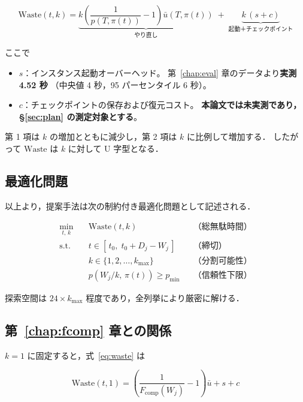 \documentclass[11pt,a4paper]{ltjsreport}
\newcommand{\Fcomp}{F_{\mathrm{comp}}}
\newcommand{\Waste}{\mathrm{Waste}}
\begin{document}
\begin{equation}
\boxed{\;
\Waste(t,k)
=
\underbrace{k \left( \frac{1}{p(T,\pi(t))} - 1 \right) \bar u(T,\pi(t))}_{\text{やり直し}}
\;+\;
\underbrace{k\,(s + c)}_{\text{起動＋チェックポイント}}
\;}
\label{eq:waste}
\end{equation}

ここで

\begin{itemize}
  \item $s$：インスタンス起動オーバーヘッド。
        第~\ref{chap:eval} 章のデータより\textbf{実測 4.52 秒}
        （中央値 4 秒，95 パーセンタイル 6 秒）。
  \item $c$：チェックポイントの保存および復元コスト。
        \textbf{本論文では未実測であり，\S\ref{sec:plan} の測定対象とする}。
\end{itemize}

第 1 項は $k$ の増加とともに減少し，第 2 項は $k$ に比例して増加する．
したがって $\Waste$ は $k$ に対して U 字型となる．

\subsection{最適化問題}

以上より，提案手法は次の制約付き最適化問題として記述される．

\begin{equation}
\begin{aligned}
\min_{t,\,k}\quad
  & \Waste(t,k) && \text{（総無駄時間）} \\[3pt]
\text{s.t.}\quad
  & t \in [\,t_0,\; t_0 + D_j - W_j\,] && \text{（締切）} \\[2pt]
  & k \in \{1, 2, \ldots, k_{\max}\}   && \text{（分割可能性）} \\[2pt]
  & p(W_j/k,\, \pi(t)) \geq p_{\min}   && \text{（信頼性下限）}
\end{aligned}
\label{eq:opt}
\end{equation}

探索空間は $24 \times k_{\max}$ 程度であり，全列挙により厳密に解ける．

\subsection{第~\ref{chap:fcomp} 章との関係}

$k = 1$ に固定すると，式~\eqref{eq:waste} は

\begin{equation}
\Waste(t,1) = \left( \frac{1}{\Fcomp(W_j)} - 1 \right) \bar u + s + c
\end{equation}
\end{document}
